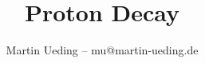 \documentclass[ngerman, fleqn]{beamer}
\title{Proton Decay}
\author{Martin Ueding -- mu@martin-ueding.de}
\begin{document}
\begin{frame}
    \titlepage
\end{frame}
\end{document}
